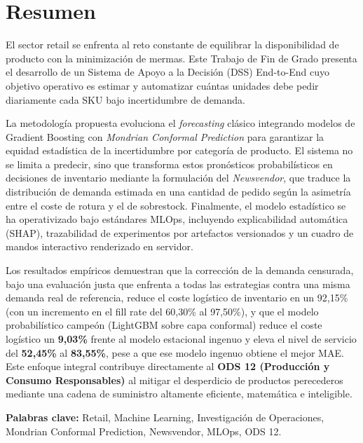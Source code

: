 \chapter*{Resumen}

El sector retail se enfrenta al reto constante de equilibrar la disponibilidad de producto con la minimización de mermas. Este Trabajo de Fin de Grado presenta el desarrollo de un Sistema de Apoyo a la Decisión (DSS) End-to-End cuyo objetivo operativo es estimar y automatizar cuántas unidades debe pedir diariamente cada SKU bajo incertidumbre de demanda.

La metodología propuesta evoluciona el \textit{forecasting} clásico integrando modelos de Gradient Boosting con \textit{Mondrian Conformal Prediction} para garantizar la equidad estadística de la incertidumbre por categoría de producto. El sistema no se limita a predecir, sino que transforma estos pronósticos probabilísticos en decisiones de inventario mediante la formulación del \textit{Newsvendor}, que traduce la distribución de demanda estimada en una cantidad de pedido según la asimetría entre el coste de rotura y el de sobrestock. Finalmente, el modelo estadístico se ha operativizado bajo estándares MLOps, incluyendo explicabilidad automática (SHAP), trazabilidad de experimentos por artefactos versionados y un cuadro de mandos interactivo renderizado en servidor.

Los resultados empíricos demuestran que la corrección de la demanda censurada, bajo una evaluación justa que enfrenta a todas las estrategias contra una misma demanda real de referencia, reduce el coste logístico de inventario en un 92{,}15\% (con un incremento en el fill rate del 60{,}30\% al 97{,}50\%), y que el modelo probabilístico campeón (LightGBM sobre capa conformal) reduce el coste logístico un \textbf{9{,}03\%} frente al modelo estacional ingenuo y eleva el nivel de servicio del \textbf{52{,}45\%} al \textbf{83{,}55\%}, pese a que ese modelo ingenuo obtiene el mejor MAE. Este enfoque integral contribuye directamente al \textbf{ODS 12 (Producción y Consumo Responsables)} al mitigar el desperdicio de productos perecederos mediante una cadena de suministro altamente eficiente, matemática e inteligible.

\textbf{Palabras clave:} Retail, Machine Learning, Investigación de Operaciones, Mondrian Conformal Prediction, Newsvendor, MLOps, ODS 12.

\newpage

